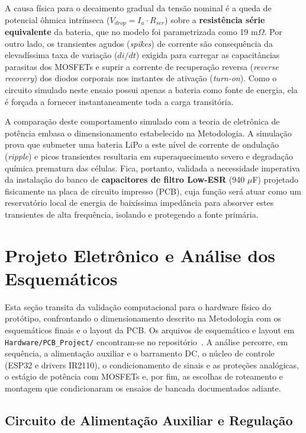 A causa física para o decaimento gradual da tensão nominal é a queda de potencial ôhmica intrínseca ($V_{drop} = I_a \cdot R_{ser}$) sobre a \textbf{resistência série equivalente} da bateria, que no modelo foi parametrizada como 19 m$\Omega$. Por outro lado, os transientes agudos (\textit{spikes}) de corrente são consequência da elevadíssima taxa de variação ($di/dt$) exigida para carregar as capacitâncias parasitas dos MOSFETs e suprir a corrente de recuperação reversa (\textit{reverse recovery}) dos diodos corporais nos instantes de ativação (\textit{turn-on}). Como o circuito simulado neste ensaio possui apenas a bateria como fonte de energia, ela é forçada a fornecer instantaneamente toda a carga transitória.

A comparação deste comportamento simulado com a teoria de eletrônica de potência embasa o dimensionamento estabelecido na Metodologia. A simulação prova que submeter uma bateria LiPo a este nível de corrente de ondulação (\textit{ripple}) e picos transientes resultaria em superaquecimento severo e degradação química prematura das células. Fica, portanto, validada a necessidade imperativa da instalação do banco de \textbf{capacitores de filtro Low-ESR} (940 $\mu$F) projetado fisicamente na placa de circuito impresso (PCB), cuja função será atuar como um reservatório local de energia de baixíssima impedância para absorver estes transientes de alta frequência, isolando e protegendo a fonte primária.


\section{Projeto Eletrônico e Análise dos Esquemáticos}

Esta seção transita da validação computacional para o hardware físico do protótipo, confrontando o dimensionamento descrito na Metodologia com os esquemáticos finais e o layout da PCB. Os arquivos de esquemático e layout em \texttt{Hardware/PCB\_Project/} encontram-se no repositório~\cite{esp32BldcEscRepo}. A análise percorre, em sequência, a alimentação auxiliar e o barramento DC, o núcleo de controle (ESP32 e drivers IR2110), o condicionamento de sinais e as proteções analógicas, o estágio de potência com MOSFETs e, por fim, as escolhas de roteamento e montagem que condicionaram os ensaios de bancada documentados adiante.

\subsection{Circuito de Alimentação Auxiliar e Regulação}

